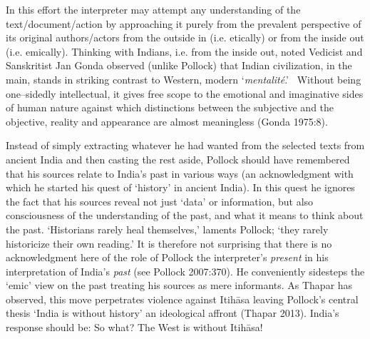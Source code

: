 In this effort the interpreter may attempt any understanding of the text/document/action by approaching it purely from the prevalent perspective of its original authors/actors from the outside in (i.e. etically) or from the inside out (i.e. emically). Thinking with Indians, i.e. from the inside out, noted Vedicist and Sanskritist Jan Gonda observed (unlike Pollock) that Indian civilization, in the main, stands in striking contrast to Western, modern ‘\textit{mentalité}.'  Without being one–sidedly intellectual, it gives free scope to the emotional and imaginative sides of human nature against which distinctions between the subjective and the objective, reality and appearance are almost meaningless (Gonda 1975:8).

Instead of simply extracting whatever he had wanted from the selected texts from ancient India and then casting the rest aside, Pollock should have remembered that his sources relate to India’s past in various ways (an acknowledgment with which he started his quest of ‘history’ in ancient India). In this quest he ignores the fact that his sources reveal not just ‘data’ or information, but also consciousness of the understanding of the past, and what it means to think about the past. ‘Historians rarely heal themselves,’ laments Pollock; ‘they rarely historicize their own reading.’ It is therefore not surprising that there is no acknowledgment here of the role of Pollock the interpreter’s \textit{present} in his interpretation of India’s \textit{past} (see Pollock 2007:370). He conveniently sidesteps the ‘emic’ view on the past treating his sources as mere informants. As Thapar has observed, this move perpetrates violence against Itihāsa leaving Pollock’s central thesis ‘India is without history’ an ideological affront (Thapar 2013). India’s response should be: So what? The West is without Itihāsa! 

